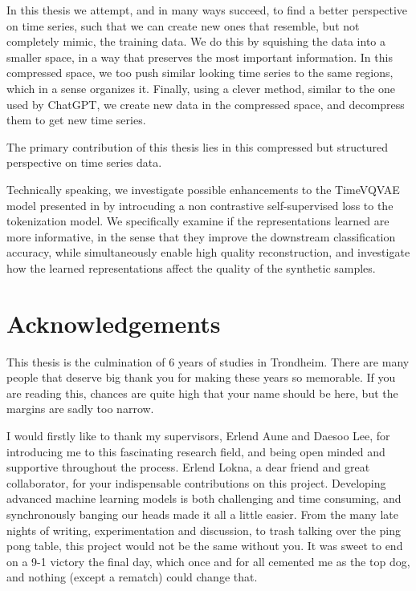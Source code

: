\documentclass[../../thesis.tex]{subfiles}
\begin{document}
In this thesis we attempt, and in many ways succeed, to find a better perspective on time series, such that we can create new ones that resemble, but not completely mimic, the training data. We do this by squishing the data into a smaller space, in a way that preserves the most important information. In this compressed space, we too push similar looking time series to the same regions, which in a sense organizes it. Finally, using a clever method, similar to the one used by ChatGPT, we create new data in the compressed space, and decompress them to get new time series.\newline

The primary contribution of this thesis lies in this compressed but structured perspective on time series data.\newline


Technically speaking, we investigate possible enhancements to the TimeVQVAE model presented in \cite{TimeVQVAE} by introcuding a non contrastive self-supervised loss to the tokenization model. We specifically examine if the representations learned are more informative, in the sense that they improve the downstream classification accuracy, while simultaneously enable high quality reconstruction, and investigate how the learned representations affect the quality of the synthetic samples.

\section{Acknowledgements}
This thesis is the culmination of 6 years of studies in Trondheim. There are many people that deserve big thank you for making these years so memorable. If you are reading this, chances are quite high that your name should be here, but the margins are sadly too narrow.\newline 

I would firstly like to thank my supervisors, Erlend Aune and Daesoo Lee, for introducing me to this fascinating research field, and being open minded and supportive throughout the process. Erlend Lokna, a dear friend and great collaborator, for your indispensable contributions on this project. Developing advanced machine learning models is both challenging and time consuming, and synchronously banging our heads made it all a little easier. From the many late nights of writing, experimentation and discussion, to trash talking over the ping pong table, this project would not be the same without you. It was sweet to end on a 9-1 victory the final day, which once and for all cemented me as the top dog, and nothing (except a rematch) could change that.\newline
\end{document}
